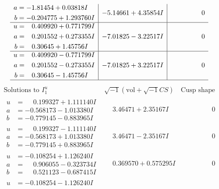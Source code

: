 \documentclass[1p]{elsarticle_modified}
\theoremstyle{definition}
\newcommand{\I}{\sqrt{-1}}
\begin{document}
$$\begin{array}{c|c|c}
\begin{aligned}
a &= -1.81454 + 0.03818 I \\
b &= -0.204775 + 1.293760 I\end{aligned}
 & -5.14661 + 4.35854 I & \phantom{-0.000000 } 0 \\ \hline\begin{aligned}
u &= \phantom{-}0.409920 + 0.771799 I \\
a &= \phantom{-}0.201552 + 0.273355 I \\
b &= \phantom{-}0.30645 + 1.45756 I\end{aligned}
 & -7.01825 - 3.22517 I & \phantom{-0.000000 } 0 \\ \hline\begin{aligned}
u &= \phantom{-}0.409920 - 0.771799 I \\
a &= \phantom{-}0.201552 - 0.273355 I \\
b &= \phantom{-}0.30645 - 1.45756 I\end{aligned}
 & -7.01825 + 3.22517 I & \phantom{-0.000000 } 0\\
 \hline 
 \end{array}$$\newpage$$\begin{array}{c|c|c}  
\text{Solutions to }I^u_{1}& \I (\text{vol} + \sqrt{-1}CS) & \text{Cusp shape}\\
 \hline 
\begin{aligned}
u &= \phantom{-}0.199327 + 1.111140 I \\
a &= -0.568173 - 1.013380 I \\
b &= -0.779145 - 0.883965 I\end{aligned}
 & \phantom{-}3.46471 + 2.35167 I & \phantom{-0.000000 } 0 \\ \hline\begin{aligned}
u &= \phantom{-}0.199327 - 1.111140 I \\
a &= -0.568173 + 1.013380 I \\
b &= -0.779145 + 0.883965 I\end{aligned}
 & \phantom{-}3.46471 - 2.35167 I & \phantom{-0.000000 } 0 \\ \hline\begin{aligned}
u &= -0.108254 + 1.126240 I \\
a &= \phantom{-}0.906055 - 0.323734 I \\
b &= \phantom{-}0.521123 - 0.687415 I\end{aligned}
 & \phantom{-}0.369570 + 0.575295 I & \phantom{-0.000000 } 0 \\ \hline\begin{aligned}
u &= -0.108254 - 1.126240 I \\

\end{aligned}
\end{array}$$
\end{document}
